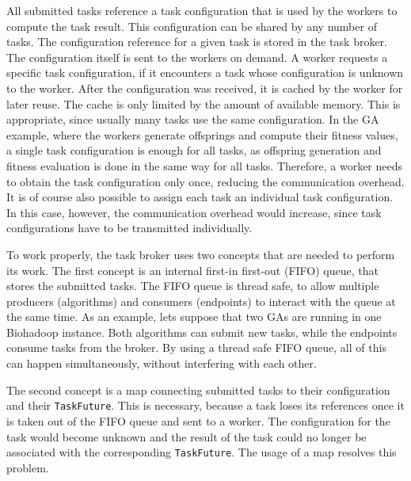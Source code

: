 All submitted tasks reference a task configuration that is used by the workers to compute the task result. This configuration can be shared by any number of tasks. The configuration reference for a given task is stored in the task broker. The configuration itself is sent to the workers on demand. A worker requests a specific task configuration, if it encounters a task whose configuration is unknown to the worker. After the configuration was received, it is cached by the worker for later reuse. The cache is only limited by the amount of available memory. This is appropriate, since usually many tasks use the same configuration. In the GA example, where the workers generate offsprings and compute their fitness values, a single task configuration is enough for all tasks, as offspring generation and fitness evaluation is done in the same way for all tasks. Therefore, a worker needs to obtain the task configuration only once, reducing the communication overhead. It is of course also possible to assign each task an individual task configuration. In this case, however, the communication overhead would increase, since task configurations have to be transmitted individually.

To work properly, the task broker uses two concepts that are needed to perform its work. The first concept is an internal first-in first-out (FIFO) queue, that stores the submitted tasks. The FIFO queue is thread safe, to allow multiple producers (algorithms) and consumers (endpoints) to interact with the queue at the same time. As an example, lets suppose that two GAs are running in one Biohadoop instance. Both algorithms can submit new tasks, while the endpoints consume tasks from the broker. By using a thread safe FIFO queue, all of this can happen simultaneously, without interfering with each other.

The second concept is a map connecting submitted tasks to their configuration and their \texttt{TaskFuture}. This is necessary, because a task loses its references once it is taken out of the FIFO queue and sent to a worker. The configuration for the task would become unknown and the result of the task could no longer be associated with the corresponding \texttt{TaskFuture}. The usage of a map resolves this problem.

